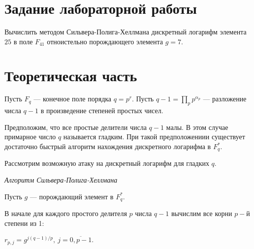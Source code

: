 \documentclass[bachelor, och, labwork]{shiza}
\begin{document}
\title{}





\author{Никитина Арсения Владимировича}




\date{2022}

\maketitle



\tableofcontents


\section{Задание лабораторной работы}
Вычислить методом Сильвера-Полига-Хеллмана дискретный логарифм элемента $25$ в 
поле $F_{41}$ отноистельно порождающего элемента $g=7$.


\section{Теоретическая часть}

Пусть $F_q$ --- конечное поле порядка $q=p^r$. Пусть $q-1 = \prod_p{p^{\alpha_p}}$ ---
разложение числа $q-1$ в произведение степеней простых чисел.

Предположим, что все простые делители числа $q-1$ малы. В этом случае примарное 
число $q$ называется гладким. При такой предположениии существует достаточно быстрый
алгоритм нахождения дискретного логарифма в $F_q^*$.

Рассмотрим возможную атаку на дискретный логарифм для гладких $q$.

\begin{center}
    \textit{Алгоритм Сильвера-Полига-Хеллмана}
\end{center}

Пусть $g$ --- порождающий элемент в $F_q^*$.

В начале для каждого простого делителя $p$ числа $q-1$ вычислим все корни $p-$й
степени из 1:

\begin{center}
    $r_{p,j}=g^{j(q-1)/p}, ~j=\overline{0,p-1}$.
\end{center}
\end{document}
